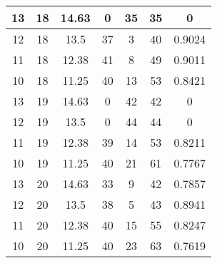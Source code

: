 \documentclass[letterpaper, 12pt]{article}
\begin{document}
\begin{longtable}{|c|c|c|c|c|c|c|}
\hline
13 & 18 & 14.63 & 0 & 35 & 35 & 0 \\
\hline
12 & 18 & 13.5 & 37 & 3 & 40 & 0.9024 \\
\hline
11 & 18 & 12.38 & 41 & 8 & 49 & 0.9011 \\
\hline
10 & 18 & 11.25 & 40 & 13 & 53 & 0.8421 \\
\hline
13 & 19 & 14.63 & 0 & 42 & 42 & 0 \\
\hline
12 & 19 & 13.5 & 0 & 44 & 44 & 0 \\
\hline
11 & 19 & 12.38 & 39 & 14 & 53 & 0.8211 \\
\hline
10 & 19 & 11.25 & 40 & 21 & 61 & 0.7767 \\
\hline
13 & 20 & 14.63 & 33 & 9 & 42 & 0.7857 \\
\hline
12 & 20 & 13.5 & 38 & 5 & 43 & 0.8941 \\
\hline
11 & 20 & 12.38 & 40 & 15 & 55 & 0.8247 \\
\hline
10 & 20 & 11.25 & 40 & 23 & 63 & 0.7619 \\
\hline
\end{longtable}
\end{document}

